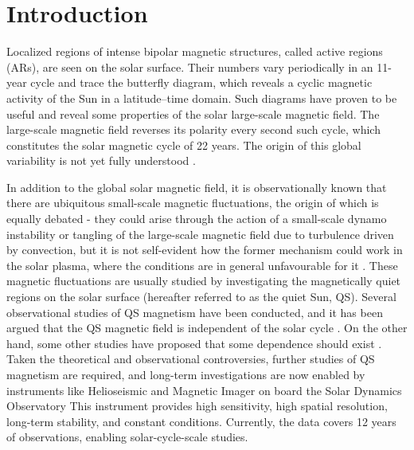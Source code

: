 \documentclass{aa}
\begin{document}

\maketitle

\section{Introduction} \label{sec:intro}

Localized regions of intense bipolar magnetic structures, called active regions
(ARs), are seen on the solar surface. Their numbers vary periodically 
in an 11-year cycle
and trace the
butterfly 
diagram,
which 
reveals 
a cyclic magnetic activity of the Sun in a latitude--time
domain. Such diagrams have proven to be useful and reveal some properties of 
the solar large-scale magnetic field. The large-scale magnetic field reverses its polarity every
second such cycle, which constitutes the solar magnetic cycle of 22 years. The origin of this
global variability is not yet fully understood \citep[see, e.g.,][]{char10}.

In addition to the global solar magnetic field, it is observationally known that there are ubiquitous small-scale magnetic fluctuations, the origin of which is equally debated - they could arise through the action of a small-scale dynamo instability or tangling of the large-scale magnetic field due to turbulence driven by convection, but it is not self-evident how the former mechanism could work in the solar plasma, where the conditions are in general unfavourable for it \citep[see, e.g.][]{BS05}. These magnetic fluctuations are usually studied by investigating the magnetically quiet regions on the solar surface (hereafter referred to as the quiet Sun, QS). Several observational
studies of QS magnetism have been conducted, and it has been argued
that the QS magnetic field is 
independent of the solar cycle 
\cite[see, e.g.,][]{Kleint+10,Buehler+13,Faurobert+15,Jin+15b,Jin+15a}. On the other hand, some other studies have proposed
that some dependence should exist \cite[e.g.][]{Lites+14,Meunier06,Faurobert+21}. 
Taken the theoretical and observational controversies, further studies of QS magnetism are required, and long-term investigations are now enabled by instruments like
Helioseismic and Magnetic Imager \cite[HMI,][]{2012SoPh..275..207S,2012SoPh..275..229S} on board the Solar Dynamics Observatory \cite[SDO,][]{2012SoPh..275....3P}
This instrument
provides high sensitivity, high spatial
resolution, long-term stability, and constant conditions. Currently, the data covers 12 years of observations, enabling solar-cycle-scale studies.
\end{document}
